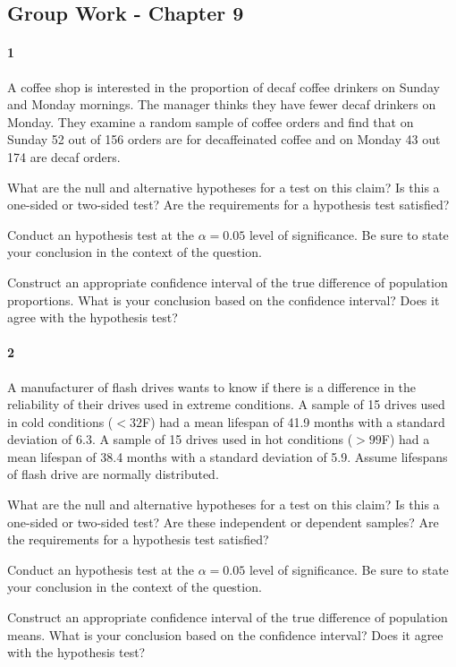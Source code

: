 \documentclass{article}
\begin{document}
\begin{flushleft}
\section*{Group Work - Chapter 9}
\paragraph{1} A coffee shop is interested in the proportion of decaf coffee drinkers on Sunday and Monday mornings. The manager thinks they have fewer decaf drinkers on Monday. They examine a random sample of coffee orders and find that on Sunday 52 out of 156 orders are for decaffeinated coffee and on Monday 43 out 174 are decaf orders.
\begin{enumalpha}
\item What are the null and alternative hypotheses for a test on this claim? Is this a one-sided or two-sided test? Are the requirements for a hypothesis test satisfied?
\vspace{2.25in}
\item Conduct an hypothesis test at the $\alpha = 0.05$ level of significance. Be sure to state your conclusion in the context of the question.
\vspace{2.25in}
\item Construct an appropriate confidence interval of the true difference of population proportions. What is your conclusion based on the confidence interval? Does it agree with the hypothesis test?
\end{enumalpha}



\newpage
\paragraph{2} A manufacturer of flash drives wants to know if there is a difference in the reliability of their drives used in extreme conditions. A sample of 15 drives used in cold conditions ($< 32 $\textdegree F) had a mean lifespan of 41.9 months with a standard deviation of 6.3. A sample of 15 drives used in hot conditions ($> 99 $\textdegree F) had a mean lifespan of 38.4 months with a standard deviation of 5.9. Assume lifespans of flash drive are normally distributed.
\begin{enumalpha}
\item What are the null and alternative hypotheses for a test on this claim? Is this a one-sided or two-sided test? Are these independent or dependent samples? Are the requirements for a hypothesis test satisfied?
\vspace{2.25in}
\item Conduct an hypothesis test at the $\alpha = 0.05$ level of significance. Be sure to state your conclusion in the context of the question.
\vspace{2.25in}
\item Construct an appropriate confidence interval of the true difference of population means. What is your conclusion based on the confidence interval? Does it agree with the hypothesis test?
\end{enumalpha}


\end{flushleft}
\end{document}
